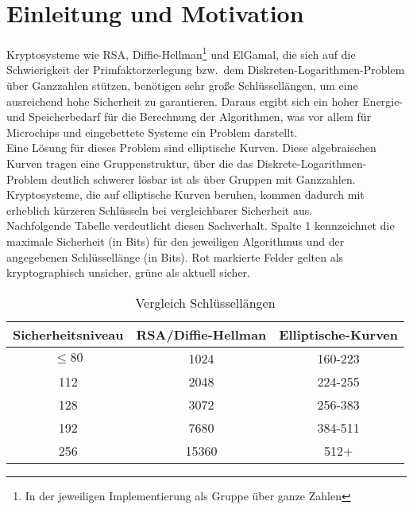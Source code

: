 \documentclass[hidelinks]{article}
\theoremstyle{plain}
\theoremstyle{definition}
\theoremstyle{rem}
\begin{document}
\begin{sloppypar}

\section{Einleitung und Motivation}
Kryptosysteme wie RSA, Diffie-Hellman\footnote{In der jeweiligen Implementierung als Gruppe über ganze Zahlen} und ElGamal\footnotemark[\value{footnote}], die sich auf die Schwierigkeit der Primfaktorzerlegung bzw.\ dem Diskreten-Logarithmen-Problem über Ganzzahlen stützen, benötigen sehr große Schlüssellängen, um eine ausreichend hohe Sicherheit zu garantieren. 
Daraus ergibt sich ein hoher Energie- und Speicherbedarf für die Berechnung der Algorithmen, was vor allem für Microchips und eingebettete Systeme ein Problem darstellt.\\
Eine Lösung für dieses Problem sind elliptische Kurven. Diese algebraischen Kurven tragen eine Gruppenstruktur, über die das Diskrete-Logarithmen-Problem deutlich schwerer lösbar ist als über Gruppen mit Ganzzahlen.
Kryptosysteme, die auf elliptische Kurven beruhen, kommen dadurch mit erheblich kürzeren Schlüsseln bei vergleichbarer Sicherheit aus.\cite[Seite~53]{nist}\\
Nachfolgende Tabelle verdeutlicht diesen Sachverhalt. Spalte 1 kennzeichnet die maximale Sicherheit (in Bits) für den jeweiligen Algorithmus und der angegebenen Schlüssellänge (in Bits). Rot markierte Felder gelten als kryptographisch unsicher, grüne als aktuell sicher.
\begin{table}[h]
\centering
	\begin{tabular}{| c | c | c |}
	\hline
	\rowcolor{lightblue}
	Sicherheitsniveau & RSA/Diffie-Hellman\footnotemark[\value{footnote}] & Elliptische-Kurven\\ \hline
	\rowcolor{lightred}
	$\le80$ 	& 1024 & 160-223 \\ \hline
	\rowcolor{lightgreen}
	112 	& 2048 & 224-255 \\ \hline
	\rowcolor{lightgreen}
	128 	& 3072 & 256-383 \\ \hline
	\rowcolor{lightgreen}
	192 	& 7680 & 384-511 \\ \hline
	\rowcolor{lightgreen}
	256 	& 15360 & 512+ \\ \hline
	\end{tabular}
\caption{Vergleich Schlüssellängen}
\label{keylength}
\end{table}


\end{sloppypar}
\end{document}
